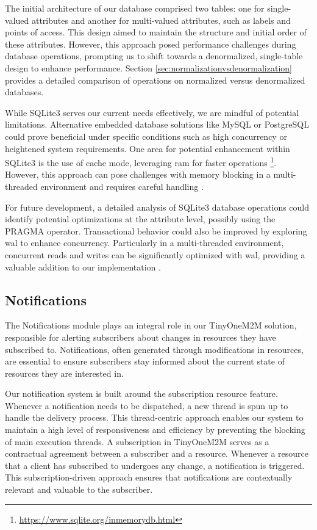 \documentclass[a4paper,fleqn]{cas-dc}
\begin{document}
The initial architecture of our database comprised two tables: one for single-valued attributes and another for multi-valued attributes, such as labels and points of access. This design aimed to maintain the structure and initial order of these attributes. However, this approach posed performance challenges during database operations, prompting us to shift towards a denormalized, single-table design to enhance performance. Section \ref{sec:normalizationvsdenormalization} provides a detailed comparison of operations on normalized versus denormalized databases.

While SQLite3 serves our current needs effectively, we are mindful of potential limitations. Alternative embedded database solutions like MySQL or PostgreSQL could prove beneficial under specific conditions such as high concurrency or heightened system requirements. One area for potential enhancement within SQLite3 is the use of cache mode, leveraging \gls{ram} for faster operations \footnote{\url{https://www.sqlite.org/inmemorydb.html}}. However, this approach can pose challenges with memory blocking in a multi-threaded environment and requires careful handling \cite{Jula2019}.

For future development, a detailed analysis of SQLite3 database operations could identify potential optimizations at the attribute level, possibly using the PRAGMA operator. Transactional behavior could also be improved by exploring \gls{wal} to enhance concurrency. Particularly in a multi-threaded environment, concurrent reads and writes can be significantly optimized with \gls{wal}, providing a valuable addition to our implementation \cite{kim_atomic_2017}.

\subsection{Notifications}

The Notifications module plays an integral role in our TinyOneM2M solution, responsible for alerting subscribers about changes in resources they have subscribed to. Notifications, often generated through modifications in resources, are essential to ensure subscribers stay informed about the current state of resources they are interested in.

Our notification system is built around the subscription resource feature. Whenever a notification needs to be dispatched, a new thread is spun up to handle the delivery process. This thread-centric approach enables our system to maintain a high level of responsiveness and efficiency by preventing the blocking of main execution threads. A subscription in TinyOneM2M serves as a contractual agreement between a subscriber and a resource. Whenever a resource that a client has subscribed to undergoes any change, a notification is triggered. This subscription-driven approach ensures that notifications are contextually relevant and valuable to the subscriber.
\end{document}
